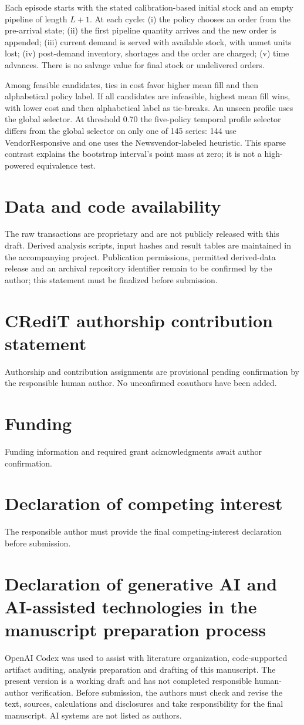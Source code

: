 \documentclass[preprint,12pt]{elsarticle}
\begin{document}
Each episode starts with the stated calibration-based initial stock and an empty pipeline of length $L+1$. At each cycle: (i) the policy chooses an order from the pre-arrival state; (ii) the first pipeline quantity arrives and the new order is appended; (iii) current demand is served with available stock, with unmet units lost; (iv) post-demand inventory, shortages and the order are charged; (v) time advances. There is no salvage value for final stock or undelivered orders.

Among feasible candidates, ties in cost favor higher mean fill and then alphabetical policy label. If all candidates are infeasible, highest mean fill wins, with lower cost and then alphabetical label as tie-breaks. An unseen profile uses the global selector. At threshold 0.70 the five-policy temporal profile selector differs from the global selector on only one of 145 series: 144 use VendorResponsive and one uses the Newsvendor-labeled heuristic. This sparse contrast explains the bootstrap interval's point mass at zero; it is not a high-powered equivalence test.

\section*{Data and code availability}
The raw transactions are proprietary and are not publicly released with this draft. Derived analysis scripts, input hashes and result tables are maintained in the accompanying project. Publication permissions, permitted derived-data release and an archival repository identifier remain to be confirmed by the author; this statement must be finalized before submission.
\section*{CRediT authorship contribution statement}
Authorship and contribution assignments are provisional pending confirmation by the responsible human author. No unconfirmed coauthors have been added.
\section*{Funding}
Funding information and required grant acknowledgments await author confirmation.
\section*{Declaration of competing interest}
The responsible author must provide the final competing-interest declaration before submission.
\section*{Declaration of generative AI and AI-assisted technologies in the manuscript preparation process}
OpenAI Codex was used to assist with literature organization, code-supported artifact auditing, analysis preparation and drafting of this manuscript. The present version is a working draft and has not completed responsible human-author verification. Before submission, the authors must check and revise the text, sources, calculations and disclosures and take responsibility for the final manuscript. AI systems are not listed as authors.


\end{document}
